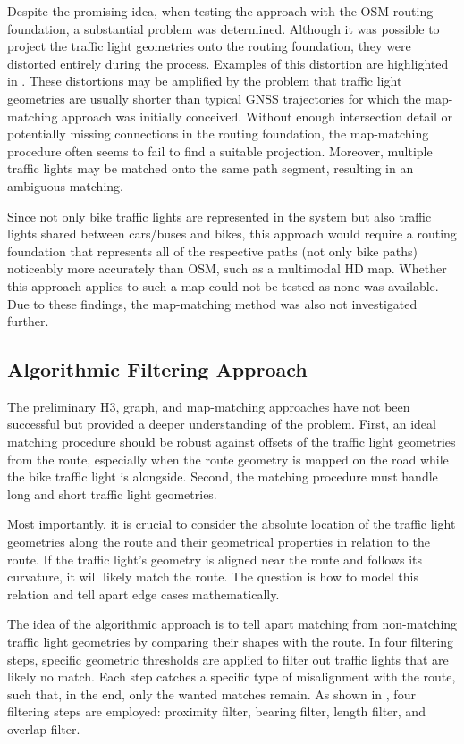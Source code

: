 Despite the promising idea, when testing the approach with the OSM routing foundation, a substantial problem was determined. Although it was possible to project the traffic light geometries onto the routing foundation, they were distorted entirely during the process. Examples of this distortion are highlighted in . These distortions may be amplified by the problem that traffic light geometries are usually shorter than typical GNSS trajectories for which the map-matching approach was initially conceived. Without enough intersection detail or potentially missing connections in the routing foundation, the map-matching procedure often seems to fail to find a suitable projection. Moreover, multiple traffic lights may be matched onto the same path segment, resulting in an ambiguous matching. 

Since not only bike traffic lights are represented in the system but also traffic lights shared between cars/buses and bikes, this approach would require a routing foundation that represents all of the respective paths (not only bike paths) noticeably more accurately than OSM, such as a multimodal HD map. Whether this approach applies to such a map could not be tested as none was available. Due to these findings, the map-matching method was also not investigated further.

\subsection{Algorithmic Filtering Approach}

The preliminary H3, graph, and map-matching approaches have not been successful but provided a deeper understanding of the problem. First, an ideal matching procedure should be robust against offsets of the traffic light geometries from the route, especially when the route geometry is mapped on the road while the bike traffic light is alongside. Second, the matching procedure must handle long and short traffic light geometries.

Most importantly, it is crucial to consider the absolute location of the traffic light geometries along the route and their geometrical properties in relation to the route. If the traffic light's geometry is aligned near the route and follows its curvature, it will likely match the route. The question is how to model this relation and tell apart edge cases mathematically.

The idea of the algorithmic approach is to tell apart matching from non-matching traffic light geometries by comparing their shapes with the route. In four filtering steps, specific geometric thresholds are applied to filter out traffic lights that are likely no match. Each step catches a specific type of misalignment with the route, such that, in the end, only the wanted matches remain. As shown in , four filtering steps are employed: proximity filter, bearing filter, length filter, and overlap filter.

